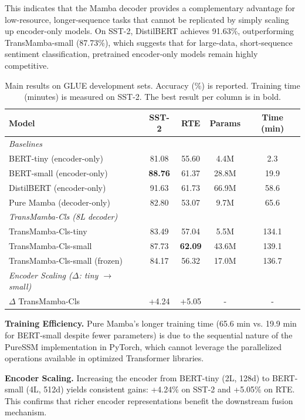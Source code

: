 \documentclass[runningheads]{llncs}
\begin{document}
This indicates that the Mamba decoder provides a complementary advantage for low-resource, longer-sequence tasks that cannot be replicated by simply scaling up encoder-only models. On SST-2, DistilBERT achieves 91.63\%, outperforming TransMamba-small (87.73\%), which suggests that for large-data, short-sequence sentiment classification, pretrained encoder-only models remain highly competitive.

\begin{table}[h]
\centering
\caption{Main results on GLUE development sets. Accuracy (\%) is reported. Training time (minutes) is measured on SST-2. The best result per column is in bold.}
\label{tab:main_results}
\begin{tabular}{lcccc}
\toprule
\textbf{Model} & \textbf{SST-2} & \textbf{RTE} & \textbf{Params} & \textbf{Time (min)} \\
\midrule
\textit{Baselines} & & & & \\
BERT-tiny (encoder-only) & 81.08 & 55.60 & 4.4M & 2.3 \\
BERT-small (encoder-only) & \textbf{88.76} & 61.37 & 28.8M & 19.9 \\
DistilBERT (encoder-only) & 91.63 & 61.73 & 66.9M & 58.6 \\
Pure Mamba (decoder-only) & 82.80 & 53.07 & 9.7M & 65.6 \\
\midrule
\textit{TransMamba-Cls (8L decoder)} & & & & \\
TransMamba-Cls-tiny & 83.49 & 57.04 & 5.5M & 134.1 \\
TransMamba-Cls-small & 87.73 & \textbf{62.09} & 43.6M & 139.1 \\
TransMamba-Cls-small (frozen) & 84.17 & 56.32 & 17.0M & 136.7 \\
\midrule
\textit{Encoder Scaling ($\Delta$: tiny $\rightarrow$ small)} & & & & \\
$\Delta$ TransMamba-Cls & +4.24 & +5.05 & - & - \\
\bottomrule
\end{tabular}
\end{table}

\noindent \textbf{Training Efficiency.} Pure Mamba's longer training time (65.6 min vs. 19.9 min for BERT-small despite fewer parameters) is due to the sequential nature of the PureSSM implementation in PyTorch, which cannot leverage the parallelized operations available in optimized Transformer libraries.

\noindent \textbf{Encoder Scaling.} Increasing the encoder from BERT-tiny (2L, 128d) to BERT-small (4L, 512d) yields consistent gains: +4.24\% on SST-2 and +5.05\% on RTE. This confirms that richer encoder representations benefit the downstream fusion mechanism.
\end{document}
